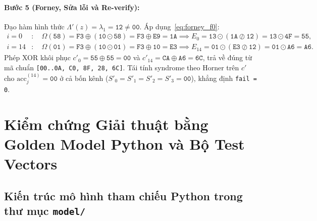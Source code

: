 \paragraph{Bước 5 (Forney, Sửa lỗi và Re-verify):} Đạo hàm hình thức $\Lambda'(z) = \lambda_1 = \texttt{12} \neq \texttt{00}$. Áp dụng~\eqref{eq:forney_f0}:
\begin{align*}
i=0 &: \quad \Omega(\texttt{58}) = \texttt{F3} \oplus (\texttt{10}\odot\texttt{58}) = \texttt{F3}\oplus\texttt{E9} = \texttt{1A} \implies E_0 = \texttt{13} \odot (\texttt{1A}\oslash\texttt{12}) = \texttt{13}\odot\texttt{4F} = \texttt{55}, \\
i=14 &: \quad \Omega(\texttt{01}) = \texttt{F3} \oplus (\texttt{10}\odot\texttt{01}) = \texttt{F3}\oplus\texttt{10} = \texttt{E3} \implies E_{14} = \texttt{01} \odot (\texttt{E3}\oslash\texttt{12}) = \texttt{01}\odot\texttt{A6} = \texttt{A6}.
\end{align*}
Phép XOR khôi phục $c'_0 = \texttt{55} \oplus \texttt{55} = \texttt{00}$ và $c'_{14} = \texttt{CA} \oplus \texttt{A6} = \texttt{6C}$, trả về đúng từ mã chuẩn \texttt{[00..0A, C0, 8F, 28, 6C]}. Tái tính syndrome theo Horner trên $c'$ cho $\text{acc}_j^{(14)} = \texttt{00}$ ở cả bốn kênh ($S'_0 = S'_1 = S'_2 = S'_3 = \texttt{00}$), khẳng định \texttt{fail = 0}.

\section{Kiểm chứng Giải thuật bằng Golden Model Python và Bộ Test Vectors}

\subsection{Kiến trúc mô hình tham chiếu Python trong thư mục \texttt{model/}}

